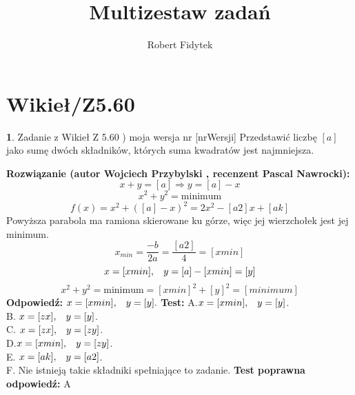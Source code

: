 \documentclass[12pt, a4paper]{article}
\title{Multizestaw zadań}
\author{Robert Fidytek}
\date{}
\theoremstyle{definition} %
\newtheorem{zad}{}
\newcommand{\kategoria}[1]{\section{#1}} %
\newcommand{\zadStart}[1]{\begin{zad}#1\newline} %
\newcommand{\zadStop}{\end{zad}}   %
\newcommand{\rozwStart}[2]{\noindent \textbf{Rozwiązanie (autor #1 , recenzent #2): }\newline} %
\newcommand{\rozwStop}{\newline}                                            %
\newcommand{\odpStart}{\noindent \textbf{Odpowiedź:}\newline}    %
\newcommand{\odpStop}{\newline}                                             %
\newcommand{\testStart}{\noindent \textbf{Test:}\newline} %
\newcommand{\testStop}{\newline} %
\newcommand{\kluczStart}{\noindent \textbf{Test poprawna odpowiedź:}\newline} %
\newcommand{\kluczStop}{\newline} %
\begin{document}
\maketitle


\kategoria{Wikieł/Z5.60}
\zadStart{Zadanie z Wikieł Z 5.60 ) moja wersja nr [nrWersji]}
Przedstawić liczbę $[a]$ jako sumę dwóch składników, których suma kwadratów jest najmniejsza.
\zadStop
\rozwStart{Wojciech Przybylski}{Pascal Nawrocki}
$$x+y=[a] \Rightarrow y=[a]-x$$
$$x^{2}+y^{2}=\mbox{minimum}$$
$$f(x)=x^{2}+([a]-x)^{2}=2x^{2}-[a2]x+[ak]$$
Powyższa parabola ma ramiona skierowane ku górze, więc jej wierzchołek jest jej minimum.
$$x_{min}=\frac{-b}{2a}=\frac{[a2]}{4}=[xmin]$$
$$x=[xmin], \hspace{3mm} y=[a]-[xmin]=[y]$$
$$x^{2}+y^{2}=\mbox{minimum}=[xmin]^{2}+[y]^{2}=[minimum]$$
\rozwStop
\odpStart
$x=[xmin], \hspace{3mm} y=[y].$
\odpStop
\testStart
A.$x=[xmin], \hspace{3mm} y=[y]$.\\
B. $x=[zx], \hspace{3mm} y=[y]$.\\
C. $x=[zx], \hspace{3mm} y=[zy]$.\\
D.$x=[xmin], \hspace{3mm} y=[zy]$.\\
E. $x=[ak], \hspace{3mm} y=[a2]$.\\
F. Nie istnieją takie składniki spełniające to zadanie.
\testStop
\kluczStart
A
\kluczStop
\end{document}
